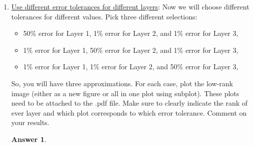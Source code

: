 \documentclass{article}
\theoremstyle{definition}
\newtheorem*{answer}{Answer}
\begin{document}
\begin{enumerate}[leftmargin=\labelsep]
\begin{enumerate}
		      \item \underline{Use different error tolerances for different layers}: Now we will choose different tolerances for different values. Pick three different selections:
		            \begin{itemize}
			            \item 50\% error for Layer 1, 1\% error for Layer 2, and 1\% error for Layer 3,
			            \item 1\% error for Layer 1, 50\% error for Layer 2, and 1\% error for Layer 3,
			            \item 1\% error for Layer 1, 1\% error for Layer 2, and 50\% error for Layer 3,
		            \end{itemize}
		            So, you will have three approximations. For each case, plot the low-rank image (either as a new figure or all in one plot using subplot). These plots need to be attached to the .pdf file. Make sure to clearly indicate the rank of ever layer and which plot corresponds to which error tolerance. Comment on your results.
		            \begin{answer}

		            \end{answer}
	      \end{enumerate}
\end{enumerate}
\end{document}
